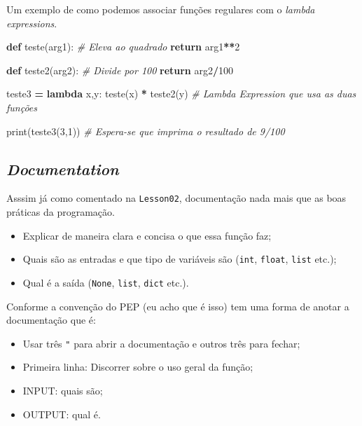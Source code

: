 \documentclass[]{book}
\newenvironment{Shaded}{\begin{snugshade}}{\end{snugshade}}
\newcommand{\KeywordTok}[1]{\textcolor[rgb]{0.13,0.29,0.53}{\textbf{#1}}}
\newcommand{\DecValTok}[1]{\textcolor[rgb]{0.00,0.00,0.81}{#1}}
\newcommand{\CommentTok}[1]{\textcolor[rgb]{0.56,0.35,0.01}{\textit{#1}}}
\newcommand{\ControlFlowTok}[1]{\textcolor[rgb]{0.13,0.29,0.53}{\textbf{#1}}}
\newcommand{\OperatorTok}[1]{\textcolor[rgb]{0.81,0.36,0.00}{\textbf{#1}}}
\newcommand{\BuiltInTok}[1]{#1}
\newcommand{\NormalTok}[1]{#1}
\providecommand{\tightlist}{%
  \setlength{\itemsep}{0pt}\setlength{\parskip}{0pt}}
\begin{document}
Um exemplo de como podemos associar funções regulares com o \emph{lambda
expressions}.

\begin{Shaded}
\begin{Highlighting}[]
\KeywordTok{def}\NormalTok{ teste(arg1):    }\CommentTok{# Eleva ao quadrado}
    \ControlFlowTok{return}\NormalTok{ arg1}\OperatorTok{**}\DecValTok{2}

\KeywordTok{def}\NormalTok{ teste2(arg2):   }\CommentTok{# Divide por 100}
    \ControlFlowTok{return}\NormalTok{ arg2}\OperatorTok{/}\DecValTok{100}

\NormalTok{teste3 }\OperatorTok{=} \KeywordTok{lambda}\NormalTok{ x,y: teste(x) }\OperatorTok{*}\NormalTok{ teste2(y) }\CommentTok{# Lambda Expression que usa as duas funções}

\BuiltInTok{print}\NormalTok{(teste3(}\DecValTok{3}\NormalTok{,}\DecValTok{1}\NormalTok{)) }\CommentTok{# Espera-se que imprima o resultado de 9/100}
\end{Highlighting}
\end{Shaded}

\subsection{\texorpdfstring{\emph{Documentation}}{Documentation}}\label{documentation}

Asssim já como comentado na \texttt{Lesson02}, documentação nada mais
que as boas práticas da programação.

\begin{itemize}
\tightlist
\item
  Explicar de maneira clara e concisa o que essa função faz;
\item
  Quais são as entradas e que tipo de variáveis são (\texttt{int},
  \texttt{float}, \texttt{list} etc.);
\item
  Qual é a saída (\texttt{None}, \texttt{list}, \texttt{dict} etc.).
\end{itemize}

Conforme a convenção do PEP (eu acho que é isso) tem uma forma de anotar
a documentação que é:

\begin{itemize}
\tightlist
\item
  Usar três \texttt{"} para abrir a documentação e outros três para
  fechar;
\item
  Primeira linha: Discorrer sobre o uso geral da função;
\item
  INPUT: quais são;
\item
  OUTPUT: qual é.
\end{itemize}
\end{document}

